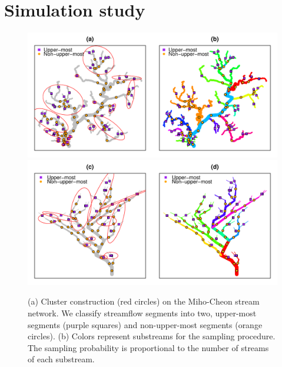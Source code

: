 \documentclass[11pt,titlepage]{article}
\begin{document}

\section{Simulation study}\label{sec:streamflowsimulationdata}


\begin{figure}
	\centering\includegraphics[width=1\textwidth]{Stream_result/Stream_cluster_maps_new(4).pdf}
	\centering\includegraphics[width=1\textwidth]{Stream_result/Stream_cluster_maps_STPCA.pdf}
	\vspace{-10mm}\caption{(a) Cluster construction (red circles) on the Miho-Cheon stream network. We classify streamflow segments into two, upper-most segments (purple squares) and non-upper-most segments (orange circles). (b) Colors represent substreams for the sampling procedure. The sampling probability is proportional to the number of streams of each substream.} %
	\label{fig:clusterconstruction}
\end{figure}
\end{document}
